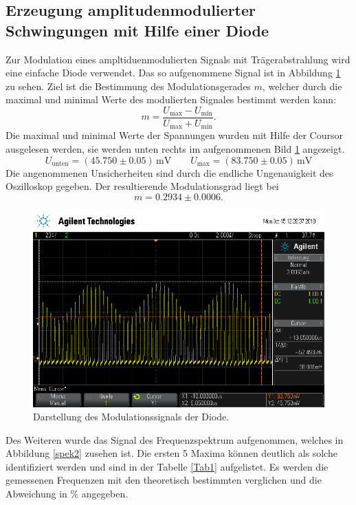 \subsection{Erzeugung amplitudenmodulierter Schwingungen mit Hilfe einer Diode}
Zur Modulation eines ampltiduenmodulierten Signals mit Trägerabstrahlung wird eine
einfache Diode verwendet. Das so aufgenommene Signal ist in Abbildung
\ref{fig:plot2} zu sehen.
Ziel ist die Bestimmung des Modulationsgerades $m$, welcher durch die
maximal und minimal Werte des modulierten Signales bestimmt werden kann:
\begin{equation}
m=\frac{U_\text{max}-U_\text{min}}{U_\text{max}+U_\text{min}}.
\end{equation}
Die maximal und minimal Werte der Spannungen wurden mit Hilfe der Coursor
ausgelesen werden, sie werden unten rechts im aufgenommenen Bild \ref{fig:plot2}
angezeigt.
\begin{equation}
    U_\text{unten}=(45.750\pm 0.05)\,\text{mV} \quad \quad
    U_\text{max}=(83.750 \pm 0.05) \,\text{mV}
\end{equation}
Die angenommenen Unsicherheiten sind durch die endliche Ungenauigkeit des Oszilloskop gegeben.
Der resultierende Modulationsgrad liegt bei
\begin{equation}
    \label{mod1}
 m=0.2934 \pm 0.0006.
\end{equation}
\begin{figure}
  \centering
  \includegraphics[width=0.7\linewidth]{ressources/scope_453.png}
  \caption{Darstellung des Modulationssignals der Diode.}
  \label{fig:plot2}
\end{figure}
Des Weiteren wurde das Signal des Frequenzspektrum aufgenommen, welches in
Abbildung \ref{spek2} zusehen ist. Die ersten 5 Maxima können deutlich als
solche identifiziert werden und sind in der Tabelle \ref{Tab1} aufgelistet.
Es werden die gemessenen Frequenzen mit den theoretisch bestimmten verglichen
und die Abweichung in $\%$  angegeben.
